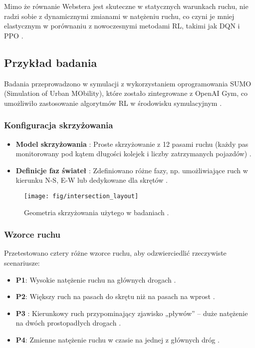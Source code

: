 \documentclass[12pt, a4paper]{article} %
\begin{document}
    Mimo że równanie Webstera jest skuteczne w statycznych warunkach ruchu, nie radzi sobie z dynamicznymi zmianami w
    natężeniu ruchu, co czyni je mniej elastycznym w porównaniu z nowoczesnymi metodami RL, takimi jak DQN i PPO
    \cite{Louw2022}.

    \subsection{Przykład badania}
    Badania przeprowadzono w symulacji z wykorzystaniem oprogramowania SUMO (Simulation of Urban MObility), które
    zostało zintegrowane z OpenAI Gym, co umożliwiło zastosowanie algorytmów RL w środowisku symulacyjnym
    \cite{Louw2022}.

    \subsubsection{Konfiguracja skrzyżowania}
    \begin{itemize}
        \item \textbf{Model skrzyżowania}
        : Proste skrzyżowanie z 12 pasami ruchu (każdy pas monitorowany pod kątem długości kolejek i liczby zatrzymanych
        pojazdów) \cite{Louw2022}.
        \item \textbf{Definicje faz świateł}
        : Zdefiniowano różne fazy, np. umożliwiające ruch w kierunku N-S, E-W lub dedykowane dla skrętów
        \cite{Allsop1971}.
    \end{itemize}

    \begin{figure}[h]
        \centering
        \texttt{[image: fig/intersection\_layout]}
        \caption{Geometria skrzyżowania użytego w badaniach \cite{Louw2022}.}
        \label{fig:intersection}
    \end{figure}

    \subsubsection{Wzorce ruchu}
    Przetestowano cztery różne wzorce ruchu, aby odzwierciedlić rzeczywiste scenariusze:

    \begin{itemize}
        \item \textbf{P1}: Wysokie natężenie ruchu na głównych drogach \cite{Louw2022}.
        \item \textbf{P2}: Większy ruch na pasach do skrętu niż na pasach na wprost \cite{Louw2022}.
        \item \textbf{P3}
        : Kierunkowy ruch przypominający zjawisko „pływów” – duże natężenie na dwóch prostopadłych drogach
        \cite{Louw2022}.
        \item \textbf{P4}: Zmienne natężenie ruchu w czasie na jednej z głównych dróg \cite{Louw2022}.
    \end{itemize}
\end{document}
